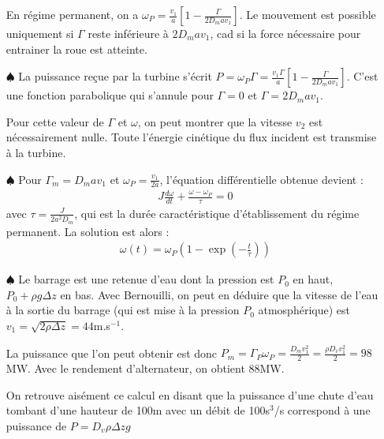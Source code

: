 \documentclass{report}
\begin{document}
\begin{itemize}
		\noindent{}
En régime permanent, on a $\omega_P=\frac{v_1}{a}\left[1-\frac{\Gamma}{2D_mav_1} \right]$. Le mouvement est possible uniquement si $\Gamma$ reste inférieure à $2D_mav_1$, cad si la force nécessaire pour entrainer la roue est atteinte.

	\item[$\spadesuit$] La puissance reçue par la turbine s'écrit $P=\omega_P\Gamma=\frac{v_1\Gamma}{a}\left[1-\frac{\Gamma}{2D_mav_1} \right]$. C'est une fonction parabolique qui s'annule pour $\Gamma=0$ et $\Gamma=2D_mav_1$. 
	
	\noindent{}

Pour cette valeur de $\Gamma$ et $\omega$, on peut montrer que la vitesse $v_2$ est nécessairement nulle. Toute l'énergie cinétique du flux incident est transmise à la turbine.

	\item[$\spadesuit$] Pour $\Gamma_m=D_mav_1$ et $\omega_P=\frac{v_1}{2a}$, l'équation différentielle obtenue devient :
	\begin{align*}
		J\frac{d\omega}{dt} + \frac{\omega-\omega_P}{\tau}=0
	\end{align*}
	avec $\tau=\frac{J}{2a^2D_m}$, qui est la durée caractéristique d'établissement du régime permanent. 
	La solution est alors :
	\begin{align*}
		\omega(t)=\omega_P\left( 1-\exp\left(-\frac{t}{\tau}\right) \right) 
	\end{align*}
	
	\item[$\spadesuit$] Le barrage est une retenue d'eau dont la pression est $P_0$ en haut, $P_0+\rho g\Delta z$ en bas. Avec Bernouilli, on peut en déduire que la vitesse de l'eau à la sortie du barrage (qui est mise à la pression $P_0$ atmosphérique) est $v_1=\sqrt{2\rho\Delta z}=44$m.s$^{-1}$.
	
	La puissance que l'on peut obtenir est donc $P_m=\Gamma_P\omega_P=\frac{D_mv_1^2}{2}=\frac{\rho D_vv_1^2}{2}=98$MW. Avec le rendement d'alternateur, on obtient 88MW.
	
	On retrouve aisément ce calcul en disant que la puissance d'une chute d'eau tombant d'une hauteur de 100m avec un débit de 100s$^3$/s correspond à une puissance de $P=D_v\rho\Delta z g$
	

\end{itemize}
\end{document}
